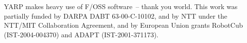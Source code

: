 
YARP makes heavy use of F/OSS software~-- thank you world.
This work was partially funded by DARPA DABT 63-00-C-10102,
and by NTT under the NTT/MIT Collaboration Agreement, and
by European Union grants RobotCub (IST-2004-004370)
and ADAPT (IST-2001-371173).
